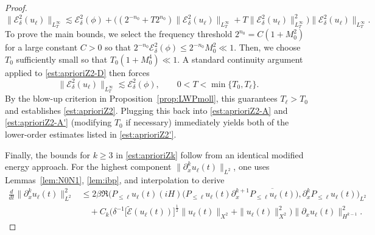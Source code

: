 \documentclass[10pt,a4paper]{amsart}
\begin{document}
\begin{proof}
\begin{equation}\label{est:aprioriZ2-D}
\| \mathcal{E}^2_\delta(u_\ell) \|_{L^\infty_T}\lesssim \mathcal{E}^2_\delta(\phi) +\Big( (2^{-n_0}+T2^{n_0}) \| \mathcal{E}^2_\delta(u_\ell) \|_{L^\infty_T} +T\| \mathcal{E}^2_\delta(u_\ell) \|_{L^\infty_T}^2\Big) \|\mathcal{E}^2_\delta(u_\ell) \|_{L^\infty_T} .
\end{equation}
To prove the main bounds, we select the frequency threshold $2^{n_0}=C(1+M_0^2)$ for a large constant $C>0$ so that $2^{-n_0}\mathcal{E}^2_\delta(\phi)\leq 2^{-n_0}M_0^2\ll 1$. Then, we choose $T_0$ sufficiently small so that $T_0(1+M_0^4)\ll 1$. A standard continuity argument applied to \eqref{est:aprioriZ2-D} then forces
$$\| \mathcal{E}^2_\delta(u_\ell) \|_{L^\infty_T}\lesssim \mathcal{E}^2_\delta(\phi),\qquad 0<T<\min \{ T_0,T_\ell\}. $$
By the blow-up criterion in Proposition~\ref{prop:LWPmoll}, this guarantees $T_\ell>T_0$ and establishes \eqref{est:aprioriZ2}. Plugging this back into \eqref{est:aprioriZ2-A} and \eqref{est:aprioriZ2-A'} (modifying $T_0$ if necessary) immediately yields both of the lower-order estimates listed in \eqref{est:aprioriZ2'}.

Finally, the bounds for $k \geq 3$ in \eqref{est:aprioriZk} follow from an identical modified energy approach. For the highest component $\| \partial_x^ku_\ell(t) \|_{L^2}$, one uses Lemmas~\ref{lem:N0N1}, \ref{lem:ibp}, and interpolation to derive
\begin{equation}\label{est:aprioriZk-1}
\begin{aligned}
\frac{d}{dt}\| \partial_x^ku_\ell(t) \|_{L^2}^2 &\leq 2\beta\Re \big( P_{\leq \ell}u_\ell(t)(iH)\big( P_{\leq \ell}u_\ell(t)\partial_x^{k+1}\overline{P_{\leq \ell}u_\ell(t)}\big) ,\partial_x^kP_{\leq \ell}u_\ell(t)\big)_{L^2} \\
&\quad +C_k\Big( \delta^{-1}\big[ \widetilde{\mathcal{E}}(u_\ell(t))\big] ^{\frac12}\| u_\ell(t) \|_{X^2}+\| u_\ell(t) \|_{X^2}^2\Big)\| \partial_xu_\ell(t) \|_{H^{k-1}}^2.
\end{aligned}
\end{equation}



\end{proof}
\end{document}
